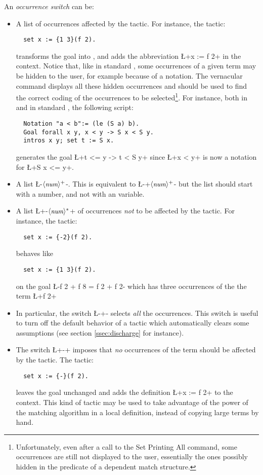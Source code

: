An \emph{occurrence switch} can be:
\begin{itemize}
\item A list  of occurrences affected by the
  tactic.
For instance, the tactic:
\begin{lstlisting}
  set x := {1 3}(f 2).
\end{lstlisting}
transforms the goal  into
, and adds the abbreviation
\L+x := f 2+ in the
context. Notice that, like in standard \Coq{},
 some occurrences of a
given term may be hidden to the user, for example because of a
notation. The vernacular  command displays all
these hidden occurrences and should be used to find the correct
coding of the occurrences to be selected\footnote{Unfortunately,
even after a call to the Set Printing All command, some occurrences are
still not displayed to the user, essentially the ones possibly hidden
in the predicate of a dependent match structure.}. For instance, both
in \ssr{} and in standard \Coq{}, the following script:
\begin{lstlisting}
  Notation "a < b":= (le (S a) b).
  Goal forall x y, x < y -> S x < S y.
  intros x y; set t := S x.
\end{lstlisting}
generates the goal
\L+t <= y -> t < S y+ since \L+x < y+ is now a notation for
\L+S x <= y+.
\item A list \L-{$\langle\mbox{\itshape\rmfamily\small num}\rangle^+$}-. This is equivalent to
    \L-{+$\langle\mbox{\itshape\rmfamily\small num}\rangle^+$}- but the list should start with a number, and
  not with an \Ltac{} variable.
\item A list \L+{-$\langle\mbox{\itshape\rmfamily\small num}\rangle^*$}+ of occurrences \emph{not} to be
  affected by the tactic. For instance, the tactic:
\begin{lstlisting}
  set x := {-2}(f 2).
\end{lstlisting}
behaves like
\begin{lstlisting}
  set x := {1 3}(f 2).
\end{lstlisting}
on the goal \L-f 2 + f 8 = f 2 + f 2- which has three occurrences of
the the term \L+f 2+
\item In particular, the switch \L-{+}- selects \emph{all} the
  occurrences. This switch is useful to turn
  off the default behavior of a tactic which automatically clears
  some assumptions (see section \ref{ssec:discharge} for instance).
\item The switch \L+{-}+ imposes that \emph{no} occurrences of the
  term should be affected by the tactic. The tactic:
\begin{lstlisting}
  set x := {-}(f 2).
\end{lstlisting}
leaves the goal unchanged and adds the definition \L+x := f 2+ to the
context. This kind of tactic may be used to take advantage of the
power of the matching algorithm in a local definition, instead of
copying large terms by hand.
\end{itemize}


